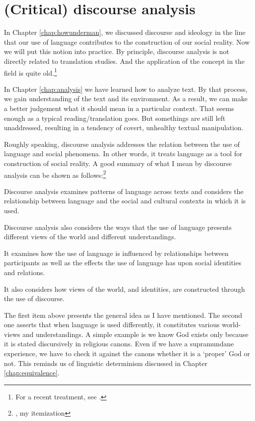 \chapter{(Critical) discourse analysis}\label{chap:discourse}

In Chapter \ref{chap:howunderman}, we discussed discourse and ideology in the line that our use of language contributes to the construction of our social reality. Now we will put this notion into practice. By principle, discourse analysis is not directly related to translation studies. And the application of the concept in the field is quite old.\footnote{For a recent treatment, see \citealp{mundayzhang:discourse}.}

In Chapter \ref{chap:analysis} we have learned how to analyze text. By that process, we gain understanding of the text and its environment. As a result, we can make a better judgement what it should mean in a particular context. That seems enough as a typical reading/translation goes. But somethings are still left unaddressed, resulting in a tendency of covert, unhealthy textual manipulation.

Roughly speaking, discourse analysis addresses the relation between the use of language and social phenomena. In other words, it treats language as a tool for construction of social reality. A good summary of what I mean by discourse analysis can be shown as follows:\footnote{\citealp[p.~2]{paltridge:discourse}, my itemization}

\begin{compactenum}[(1)]
\item Discourse analysis examines patterns of language across texts and considers the relationship between language and the social and cultural contexts in which it is used. 
\item Discourse analysis also considers the ways that the use of language presents different views of the world and different understandings.
\item It examines how the use of language is influenced by relationships between participants as well as the effects the use of language has upon social identities and relations.
\item It also considers how views of the world, and identities, are constructed through the use of discourse.
\end{compactenum}

The first item above presents the general idea as I have mentioned. The second one asserts that when language is used differently, it constitutes various world-views and understandings. A simple example is we know God exists only because it is stated discursively in religious canons. Even if we have a supramundane experience, we have to check it against the canons whether it is a `proper' God or not. This reminds us of linguistic determinism discussed in Chapter \ref{chap:equivalence}.

